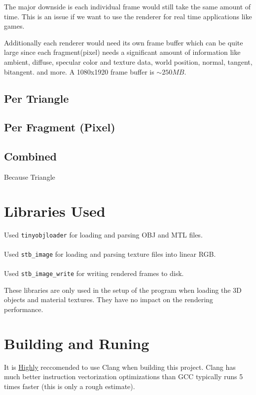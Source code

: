 \documentclass[12pt]{article}
\begin{document}
The major downside is each individual frame would still take the same amount of time. This is an issue if we want to use the renderer for real time applications like games.

Additionally each renderer would need its own frame buffer which can be quite large since each fragment(pixel) needs a significant amount of information like ambient, diffuse, specular color and texture data, world position, normal, tangent, bitangent. and more. A 1080x1920 frame buffer is $\sim 250MB$.

\subsection{Per Triangle}


\subsection{Per Fragment (Pixel)}


\subsection{Combined}
Because Triangle 




\section{Libraries Used}

Used \texttt{tinyobjloader}\cite{tinyobjloader} for loading and parsing OBJ and MTL files.\\
\\
Used \texttt{stb\_image}\cite{stb-image} for loading and parsing texture files into linear RGB.\\
\\
Used \texttt{stb\_image\_write}\cite{stb-image-write} for writing rendered frames to disk.

These libraries are only used in the setup of the program when loading the 3D objects and material textures. They have no impact on the rendering performance.

\section{Building and Runing}

It is \underline{Highly} reccomended to use Clang when building this project. Clang has much better instruction vectorization optimizations than GCC typically runs 5 times faster (this is only a rough estimate). 
\\
\end{document}
